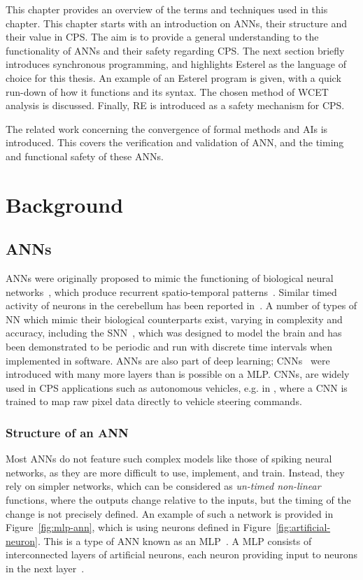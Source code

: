 This chapter provides an overview of the terms and techniques used in this chapter.
This chapter starts with an introduction on \acp{ANN}, their structure and their value in \ac{CPS}.
The aim is to provide a general understanding to the functionality of \acp{ANN} and their safety regarding \ac{CPS}.
The next section briefly introduces synchronous programming, and highlights Esterel as the language of choice for this thesis. 
An example of an Esterel program is given, with a quick run-down of how it functions and its syntax.
The chosen method of \acf{WCET} analysis is discussed.
Finally, \ac{RE} is introduced as a safety mechanism for \ac{CPS}.

The related work concerning the convergence of formal methods and \acp{AI} is introduced.
This covers the verification and validation of \ac{ANN}, and the timing and functional safety of these \acp{ANN}.

\section{Background}
\subsection{\acfp{ANN}}
\acp{ANN} were originally proposed to mimic the functioning of  biological neural networks~\cite{kohonen1988introduction}, which produce recurrent spatio-temporal patterns~\cite{rolston2007precisely}. 
Similar timed activity of neurons in the cerebellum has been reported in~\cite{bullock1994neural, moore1989adaptively}. 
A number of types of \ac{NN} which mimic their biological counterparts exist, varying in complexity and accuracy, including the \ac{SNN}~\cite{izhikevich2003spiking,maass1997spiking}, which was designed to model the brain and has been demonstrated to be periodic and run with discrete time intervals when implemented in software. 
\acp{ANN} are also part of deep learning; \acfp{CNN}~\cite{schmidhuber2015deep} were introduced with many more layers than is possible on a \ac{MLP}. 
\acp{CNN}, are widely used in \ac{CPS} applications such as autonomous vehicles, e.g. in \cite{EndToEndLearningForSelfDrivingCars}, where a \ac{CNN} is trained to map raw pixel data directly to vehicle steering commands.

\subsubsection{Structure of an \acf{ANN}}
Most \acp{ANN} do not feature such complex models like those of spiking neural networks, as they are more difficult to use, implement, and train. 
Instead, they rely on simpler networks, which can be considered as \emph{un-timed non-linear} functions, where the outputs change relative to the inputs, but the timing of the change is not precisely defined. 
An example of such a network is provided in Figure~\ref{fig:mlp-ann}, which is using neurons defined in Figure~\ref{fig:artificial-neuron}. 
This is a type of \ac{ANN} known as an \acf{MLP}~\cite{yegnanarayana1994artificial}.
A \ac{MLP} consists of interconnected layers of artificial neurons, each neuron providing input to neurons in the next layer~\cite{grad-desc}.

